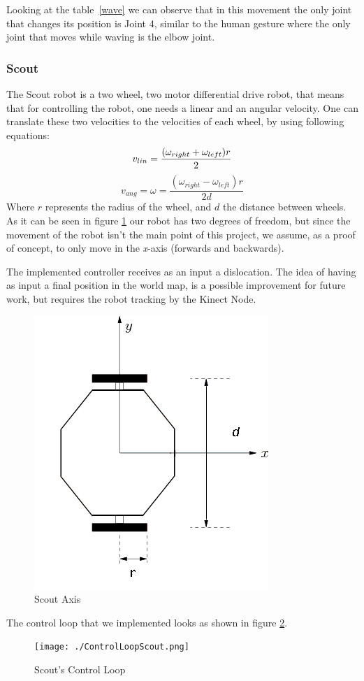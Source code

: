 Looking at the table~\ref{wave} we can observe that in this movement the only joint that changes its position is Joint 4, similar to the human gesture where the only joint that moves while waving is the elbow joint.

\subsubsection{Scout}
The Scout robot is a two wheel, two motor differential drive robot, that means that for controlling the robot, one needs a linear and an angular velocity. One can translate these two velocities to the velocities of each wheel, by using following equations:
\begin{equation}
v_{lin} = \frac{(\omega_{right}+\omega_{left})r}{2} \\
\end{equation}
\begin{equation}
v_{ang} = \omega = \frac{(\omega_{right}-\omega_{left})r}{2d}
\end{equation}
Where $r$ represents the radius of the wheel, and $d$ the distance between wheels.
As it can be seen in figure \ref{fig:scout_axis} our robot has two degrees of freedom, but since the movement of the robot isn't the main point of this project, we assume, as a proof of concept, to only move in the \textit{x}-axis (forwards and backwards).

The implemented controller receives as an input a dislocation. The idea of having as input a final position in the world map, is a possible improvement for future work, but requires the robot tracking by the Kinect Node.

\begin{figure}[!h]
    \centering
    \includegraphics[width=0.5\columnwidth]{./ScoutAxis.png}
    \caption{Scout Axis}
    \label{fig:scout_axis}
\end{figure}
The control loop that we implemented looks as shown in figure \ref{fig:scout_loop}.
\begin{figure}[!h]
    \centering
    \texttt{[image: ./ControlLoopScout.png]}
    \caption{Scout's Control Loop}
    \label{fig:scout_loop}
\end{figure}